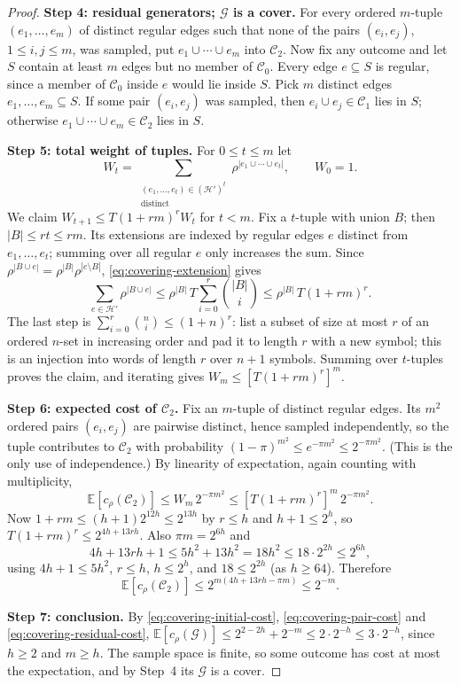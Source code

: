\documentclass[11pt,letterpaper]{article}
\theoremstyle{definition}
\theoremstyle{remark}
\numberwithin{equation}{section}
\newcommand{\step}[1]{\par\smallskip\noindent\textbf{#1}\enspace}
\begin{document}
\begin{proof}
\step{Step 4: residual generators; $\mathcal G$ is a cover.}
For every ordered $m$-tuple $(e_1,\ldots,e_m)$ of distinct regular edges
such that none of the pairs $(e_i,e_j)$, $1\le i,j\le m$, was sampled,
put $e_1\cup\cdots\cup e_m$ into $\mathcal C_2$. Now fix any outcome and
let $S$ contain at least $m$ edges but no member of $\mathcal C_0$.
Every edge $e\subseteq S$ is regular, since a member of $\mathcal C_0$
inside $e$ would lie inside $S$. Pick $m$ distinct edges
$e_1,\ldots,e_m\subseteq S$. If some pair $(e_i,e_j)$ was sampled, then
$e_i\cup e_j\in\mathcal C_1$ lies in $S$; otherwise
$e_1\cup\cdots\cup e_m\in\mathcal C_2$ lies in $S$.

\step{Step 5: total weight of tuples.}
For $0\le t\le m$ let
\[
W_t=
\sum_{\substack{(e_1,\ldots,e_t)\in(\mathcal H')^t\\ \text{distinct}}}
  \rho^{|e_1\cup\cdots\cup e_t|},
\qquad W_0=1.
\]
We claim $W_{t+1}\le T(1+rm)^rW_t$ for $t<m$. Fix a $t$-tuple with union
$B$; then $|B|\le rt\le rm$. Its extensions are indexed by regular edges
$e$ distinct from $e_1,\ldots,e_t$; summing over all regular $e$ only
increases the sum. Since
$\rho^{|B\cup e|}=\rho^{|B|}\rho^{|e\setminus B|}$,
\eqref{eq:covering-extension} gives
\[
\sum_{e\in\mathcal H'}\rho^{|B\cup e|}
\le\rho^{|B|}\,T\sum_{i=0}^r\binom{|B|}{i}
\le\rho^{|B|}\,T(1+rm)^r.
\]
The last step is $\sum_{i=0}^r\binom ni\le(1+n)^r$: list a subset of size
at most $r$ of an ordered $n$-set in increasing order and pad it to
length $r$ with a new symbol; this is an injection into words of length
$r$ over $n+1$ symbols. Summing over $t$-tuples proves the claim, and
iterating gives $W_m\le[T(1+rm)^r]^m$.

\step{Step 6: expected cost of $\mathcal C_2$.}
Fix an $m$-tuple of distinct regular edges. Its $m^2$ ordered pairs
$(e_i,e_j)$ are pairwise distinct, hence sampled independently, so the
tuple contributes to $\mathcal C_2$ with probability
$(1-\pi)^{m^2}\le e^{-\pi m^2}\le2^{-\pi m^2}$. (This is the only use of
independence.) By linearity of expectation, again counting with
multiplicity,
\[
\mathbb E[c_\rho(\mathcal C_2)]
\le W_m\,2^{-\pi m^2}\le[T(1+rm)^r]^m\,2^{-\pi m^2}.
\]
Now $1+rm\le(h+1)2^{12h}\le2^{13h}$ by $r\le h$ and $h+1\le2^h$, so
$T(1+rm)^r\le2^{4h+13rh}$. Also $\pi m=2^{6h}$ and
\[
4h+13rh+1\le5h^2+13h^2=18h^2\le18\cdot2^{2h}\le2^{6h},
\]
using $4h+1\le5h^2$, $r\le h$, $h\le2^h$, and $18\le2^{2h}$ (as
$h\ge64$). Therefore
\begin{equation}\label{eq:covering-residual-cost}
\mathbb E[c_\rho(\mathcal C_2)]
\le2^{m(4h+13rh-\pi m)}\le2^{-m}.
\end{equation}

\step{Step 7: conclusion.}
By \eqref{eq:covering-initial-cost}, \eqref{eq:covering-pair-cost} and
\eqref{eq:covering-residual-cost},
$\mathbb E[c_\rho(\mathcal G)]\le2^{2-2h}+2^{-m}\le2\cdot2^{-h}
\le3\cdot2^{-h}$, since $h\ge2$ and $m\ge h$. The sample space is finite,
so some outcome has cost at most the expectation, and by Step~4 its
$\mathcal G$ is a cover.
\end{proof}
\end{document}
